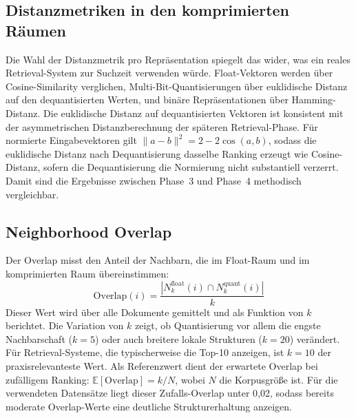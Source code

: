 \subsection{Distanzmetriken in den komprimierten Räumen}
%
Die Wahl der Distanzmetrik pro Repräsentation spiegelt das wider, was ein reales Retrieval-System zur Suchzeit verwenden würde.
Float-Vektoren werden über Cosine-Similarity verglichen, Multi-Bit-Quantisierungen über euklidische Distanz auf den dequantisierten Werten, und binäre Repräsentationen über Hamming-Distanz.
%
Die euklidische Distanz auf dequantisierten Vektoren ist konsistent mit der asymmetrischen Distanzberechnung der späteren Retrieval-Phase.
Für normierte Eingabevektoren gilt $\|a - b\|^2 = 2 - 2 \cos(a, b)$, sodass die euklidische Distanz nach Dequantisierung dasselbe Ranking erzeugt wie Cosine-Distanz, sofern die Dequantisierung die Normierung nicht substantiell verzerrt.
Damit sind die Ergebnisse zwischen Phase~3 und Phase~4 methodisch vergleichbar.
%
\subsection{Neighborhood Overlap}
%
Der Overlap misst den Anteil der Nachbarn, die im Float-Raum und im komprimierten Raum übereinstimmen:
\begin{equation}
  \text{Overlap}(i) = \frac{|N_k^\text{float}(i) \cap N_k^\text{quant}(i)|}{k}
\end{equation}
%
Dieser Wert wird über alle Dokumente gemittelt und als Funktion von $k$ berichtet.
Die Variation von $k$ zeigt, ob Quantisierung vor allem die engste Nachbarschaft ($k = 5$) oder auch breitere lokale Strukturen ($k = 20$) verändert.
Für Retrieval-Systeme, die typischerweise die Top-10 anzeigen, ist $k = 10$ der praxisrelevanteste Wert.
%
Als Referenzwert dient der erwartete Overlap bei zufälligem Ranking: $\mathbb{E}[\text{Overlap}] = k / N$, wobei $N$ die Korpusgröße ist.
Für die verwendeten Datensätze liegt dieser Zufalls-Overlap unter 0{,}02, sodass bereits moderate Overlap-Werte eine deutliche Strukturerhaltung anzeigen.
%
